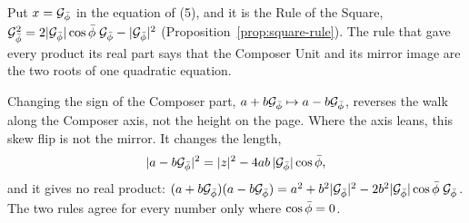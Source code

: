 Put $x = \mathcal{G}_{\bar{\phi}}$ in the equation of (5), and it is the Rule of the Square, $\mathcal{G}_{\bar{\phi}}^2 = 2|\mathcal{G}_{\bar{\phi}}|\cos\bar{\phi}\;\mathcal{G}_{\bar{\phi}} - |\mathcal{G}_{\bar{\phi}}|^2$ (Proposition~\ref{prop:square-rule}). The rule that gave every product its real part says that the Composer Unit and its mirror image are the two roots of one quadratic equation.

\begin{remark}\label{rem:gn-skew-flip}
Changing the sign of the Composer part, $a + b\mathcal{G}_{\bar{\phi}} \mapsto a - b\mathcal{G}_{\bar{\phi}}$, reverses the walk along the Composer axis, not the height on the page. Where the axis leans, this skew flip is not the mirror. It changes the length,
\[
|a - b\mathcal{G}_{\bar{\phi}}|^2 = |z|^2 - 4ab\,|\mathcal{G}_{\bar{\phi}}|\cos\bar{\phi} ,
\]
and it gives no real product: $(a + b\mathcal{G}_{\bar{\phi}})(a - b\mathcal{G}_{\bar{\phi}}) = a^2 + b^2|\mathcal{G}_{\bar{\phi}}|^2 - 2b^2|\mathcal{G}_{\bar{\phi}}|\cos\bar{\phi}\;\mathcal{G}_{\bar{\phi}}$. The two rules agree for every number only where $\cos\bar{\phi} = 0$.
\end{remark}

